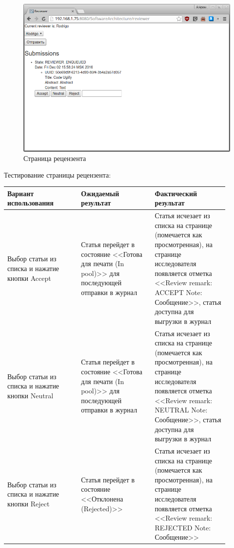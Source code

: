 \begin{figure}[H]
\centering
\includegraphics[width=\textwidth]{reviewer.png}
\caption{Страница рецензента}
\end{figure}
Тестирование страницы рецензента:
\begin{center}
	\begin{longtable}{|p{0.3\linewidth}|p{0.3\linewidth}|p{0.3\linewidth}|}
		\hline
		\textbf{Вариант использования} & \textbf{Ожидаемый результат}&
		\textbf{Фактический результат}\\
		\hline
		Выбор статьи из списка и нажатие кнопки Accept & Статья перейдет в состояние <<Готова для печати (In pool)>> для последующей отправки в журнал & Статья исчезает из списка на странице (помечается как просмотренная), на странице исследователя появляется отметка <<Review remark: ACCEPT Note: Сообщение>>, статья доступна для выгрузки в журнал \\
		\hline
		Выбор статьи из списка и нажатие кнопки Neutral & Статья перейдет в состояние <<Готова для печати (In pool)>> для последующей отправки в журнал & Статья исчезает из списка на странице (помечается как просмотренная), на странице исследователя появляется отметка <<Review remark: NEUTRAL Note: Сообщение>>, статья доступна для выгрузки в журнал \\
		\hline
		Выбор статьи из списка и нажатие кнопки Reject & Статья перейдет в состояние <<Отклонена (Rejected)>> & Статья исчезает из списка на странице (помечается как просмотренная), на странице исследователя появляется отметка <<Review remark: REJECTED Note: Сообщение>> \\
		\hline
	\end{longtable}
\end{center}

